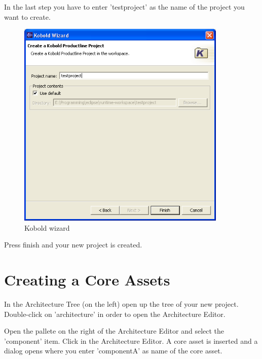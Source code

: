 In the last step you have to enter 'testproject' as the name of the project you want to create.

\begin{figure}[h!]
\begin{center}
\includegraphics[width=10cm]{tutorial6.png}
   \caption{Kobold wizard}
\end{center}
\end{figure}\par

Press finish and your new project is created.


\section{Creating a Core Assets}

In the Architecture Tree (on the left) open up the tree of your new project. Double-click on 'architecture' in order to 
open the Architecture Editor. \par

Open the pallete on the right of the Architecture Editor and select the 'component' item. Click in 
the Architecture Editor. A core asset is inserted and a dialog opens where you enter 'componentA' as name of
the core asset. 

